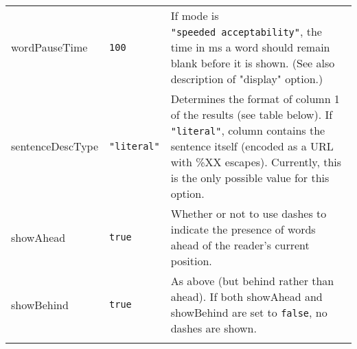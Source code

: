 \documentclass[
]{article}
\begin{document}
\begin{RaggedRight}
\begin{longtable}[]{p{1.7in}p{1in}p{3.15in}}
\begin{minipage}[t]{0.15\columnwidth}
wordPauseTime\strut
\end{minipage} & \begin{minipage}[t]{0.22\columnwidth}\raggedright
\texttt{100}\strut
\end{minipage} & \begin{minipage}[t]{0.54\columnwidth}\raggedright
If mode is \texttt{"speeded\ acceptability"}, the time in ms a word
should remain blank before it is shown. (See also description of
"display" option.)\strut
\end{minipage}\tabularnewline
\begin{minipage}[t]{0.15\columnwidth}\raggedright
sentenceDescType\strut
\end{minipage} & \begin{minipage}[t]{0.22\columnwidth}\raggedright
\texttt{"literal"}\strut
\end{minipage} & \begin{minipage}[t]{0.54\columnwidth}\raggedright
Determines the format of column 1 of the results (see table below). If
\texttt{"literal"}, column contains the sentence itself (encoded as a
URL with \%XX escapes). Currently, this is the only possible value for
this option.\strut
\end{minipage}\tabularnewline
\begin{minipage}[t]{0.15\columnwidth}\raggedright
showAhead\strut
\end{minipage} & \begin{minipage}[t]{0.22\columnwidth}\raggedright
\texttt{true}\strut
\end{minipage} & \begin{minipage}[t]{0.54\columnwidth}\raggedright
Whether or not to use dashes to indicate the presence of words ahead of
the reader's current position.\strut
\end{minipage}\tabularnewline
\begin{minipage}[t]{0.15\columnwidth}\raggedright
showBehind\strut
\end{minipage} & \begin{minipage}[t]{0.22\columnwidth}\raggedright
\texttt{true}\strut
\end{minipage} & \begin{minipage}[t]{0.54\columnwidth}\raggedright
As above (but behind rather than ahead). If both showAhead and
showBehind are set to \texttt{false}, no dashes are shown.\strut
\end{minipage}\tabularnewline
\begin{minipage}[t]{0.15\columnwidth}\raggedright

\end{minipage}
\end{longtable}
\end{RaggedRight}
\end{document}
